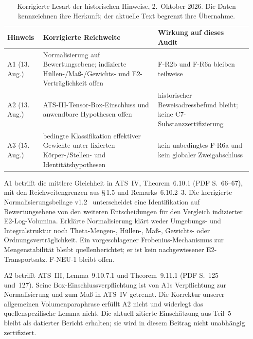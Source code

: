 \documentclass[11pt,a4paper]{article}
\begin{document}
\begin{table}[htbp]
\centering\footnotesize
\begin{tabularx}{\textwidth}{@{}l >{\raggedright\arraybackslash}X >{\raggedright\arraybackslash}X@{}}
\toprule
Hinweis & Korrigierte Reichweite & Wirkung auf dieses Audit \\
\midrule
A1 (13. Aug.) & Normalisierung auf Bewertungsebene; indizierte Hüllen-/Maß-/Gewichts- und E2-Verträglichkeit offen & F-R2b und F-R6a bleiben teilweise \\
A2 (13. Aug.) & ATS-III-Tensor-Box-Einschluss und anwendbare Hypothesen offen & historischer Beweisadressbefund bleibt; keine C7-Substanzzertifizierung \\
A3 (15. Aug.) & bedingte Klassifikation effektiver Gewichte unter fixierten Körper-/Stellen- und Identitätshypothesen & kein unbedingtes F-R6a und kein globaler Zweigabschluss \\
\bottomrule
\end{tabularx}
\caption{Korrigierte Lesart der historischen Hinweise, 2.~Oktober 2026.
Die Daten kennzeichnen ihre Herkunft; der aktuelle Text begrenzt ihre Übernahme.}
\label{tab:status-notices}
\end{table}

A1 betrifft die mittlere Gleichheit in ATS~IV, Theorem~6.10.1
(PDF S.~66--67), mit den Reichweitengrenzen aus \S\,1.5 und
Remarks~6.10.2--3. Die korrigierte Normalisierungsbeilage
v1.2~\cite{gnc} unterscheidet eine Identifikation auf Bewertungsebene
von den weiteren Entscheidungen für den Vergleich indizierter
E2-Log-Volumina. Erklärte Normalisierung klärt weder Umgebungs- und
Integralstruktur noch Theta-Mengen-, Hüllen-, Maß-, Gewichts- oder
Ordnungsverträglichkeit. Ein vorgeschlagener Frobenius-Mechanismus
zur Mengenstabilität bleibt quellenberichtet; er ist kein
nachgewiesener E2-Transportsatz. F-NEU-1 bleibt offen.

A2 betrifft ATS~III, Lemma~9.10.7.1 und Theorem~9.11.1
(PDF S.~125 und~127). Seine Box-Einschlussverpflichtung ist von
A1s Verpflichtung zur Normalisierung und zum Maß in ATS~IV getrennt. Die Korrektur
unserer allgemeinen Volumenparaphrase erfüllt A2 nicht und widerlegt
das quellenspezifische Lemma nicht. Die aktuell zitierte
Einschätzung aus Teil~5~\cite{part5} bleibt als datierter Bericht
erhalten; sie wird in diesem Beitrag nicht unabhängig zertifiziert.
\end{document}
